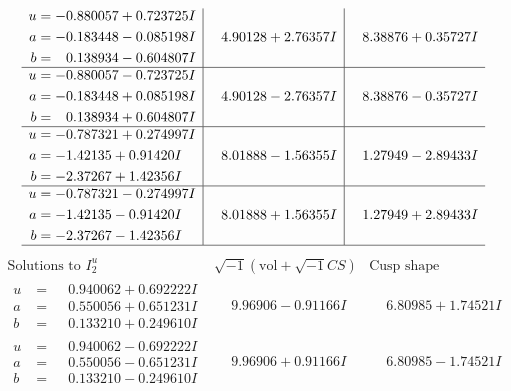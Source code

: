 \documentclass[1p]{elsarticle_modified}
\theoremstyle{definition}
\newcommand{\I}{\sqrt{-1}}
\begin{document}
$$\begin{array}{c|c|c}
\begin{aligned}
u &= -0.880057 + 0.723725 I \\
a &= -0.183448 - 0.085198 I \\
b &= \phantom{-}0.138934 - 0.604807 I\end{aligned}
 & \phantom{-}4.90128 + 2.76357 I & \phantom{-}8.38876 + 0.35727 I \\ \hline\begin{aligned}
u &= -0.880057 - 0.723725 I \\
a &= -0.183448 + 0.085198 I \\
b &= \phantom{-}0.138934 + 0.604807 I\end{aligned}
 & \phantom{-}4.90128 - 2.76357 I & \phantom{-}8.38876 - 0.35727 I \\ \hline\begin{aligned}
u &= -0.787321 + 0.274997 I \\
a &= -1.42135 + 0.91420 I \\
b &= -2.37267 + 1.42356 I\end{aligned}
 & \phantom{-}8.01888 - 1.56355 I & \phantom{-}1.27949 - 2.89433 I \\ \hline\begin{aligned}
u &= -0.787321 - 0.274997 I \\
a &= -1.42135 - 0.91420 I \\
b &= -2.37267 - 1.42356 I\end{aligned}
 & \phantom{-}8.01888 + 1.56355 I & \phantom{-}1.27949 + 2.89433 I\\
 \hline 
 \end{array}$$\newpage$$\begin{array}{c|c|c}  
\text{Solutions to }I^u_{2}& \I (\text{vol} + \sqrt{-1}CS) & \text{Cusp shape}\\
 \hline 
\begin{aligned}
u &= \phantom{-}0.940062 + 0.692222 I \\
a &= \phantom{-}0.550056 + 0.651231 I \\
b &= \phantom{-}0.133210 + 0.249610 I\end{aligned}
 & \phantom{-}9.96906 - 0.91166 I & \phantom{-}6.80985 + 1.74521 I \\ \hline\begin{aligned}
u &= \phantom{-}0.940062 - 0.692222 I \\
a &= \phantom{-}0.550056 - 0.651231 I \\
b &= \phantom{-}0.133210 - 0.249610 I\end{aligned}
 & \phantom{-}9.96906 + 0.91166 I & \phantom{-}6.80985 - 1.74521 I \\ \hline\begin{aligned}

\end{aligned}
\end{array}$$
\end{document}
